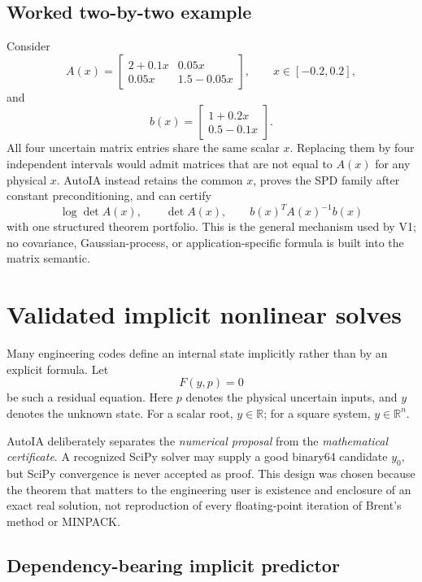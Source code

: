 \documentclass[11pt]{article}
\begin{document}
\subsection{Worked two-by-two example}

Consider
\[
  A(x)=
  \begin{bmatrix}
  2+0.1x & 0.05x\\
  0.05x & 1.5-0.05x
  \end{bmatrix},
  \qquad x\in[-0.2,0.2],
\]
and
\[
  b(x)=
  \begin{bmatrix}
  1+0.2x\\ 0.5-0.1x
  \end{bmatrix}.
\]
All four uncertain matrix entries share the same scalar \(x\).  Replacing them
by four independent intervals would admit matrices that are not equal to
\(A(x)\) for any physical \(x\).  AutoIA instead retains the common \(x\), proves
the SPD family after constant preconditioning, and can certify
\[
  \log\det A(x),
  \qquad
  \det A(x),
  \qquad
  b(x)^T A(x)^{-1}b(x)
\]
with one structured theorem portfolio.  This is the general mechanism used by
V1; no covariance, Gaussian-process, or application-specific formula is built
into the matrix semantic.

\section{Validated implicit nonlinear solves}

Many engineering codes define an internal state implicitly rather than by an
explicit formula.  Let
\[
  F(y,p)=0
\]
be such a residual equation.  Here \(p\) denotes the physical uncertain inputs,
and \(y\) denotes the unknown state.  For a scalar root, \(y\in\mathbb{R}\); for
a square system, \(y\in\mathbb{R}^n\).

AutoIA deliberately separates the \emph{numerical proposal} from the
\emph{mathematical certificate}.  A recognized SciPy solver may supply a good
binary64 candidate \(y_0\), but SciPy convergence is never accepted as proof.
This design was chosen because the theorem that matters to the engineering user
is existence and enclosure of an exact real solution, not reproduction of every
floating-point iteration of Brent's method or MINPACK.

\subsection{Dependency-bearing implicit predictor}
\end{document}
